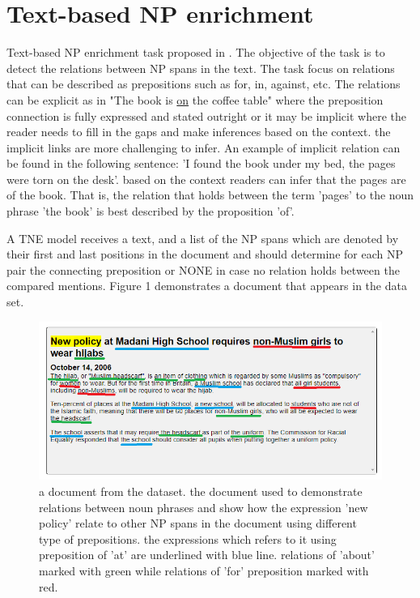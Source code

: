 \documentclass[11pt, a4paper, twocolumn]{article}
\begin{document}
\section{Text-based NP enrichment}
\label{task}

Text-based NP enrichment task proposed in \cite{tne}. The objective of the task is to detect the relations between NP spans in the text. The task focus on relations that can be described as prepositions such as for, in, against, etc.
The relations can be explicit as in "The book is 
\underline{on} the coffee table" where the preposition connection is fully expressed and stated outright or it may be implicit where the reader needs to fill in the gaps and make inferences based on the context. the implicit links are more challenging to infer.
An example of implicit relation can be found in the following sentence:
'I found the book under my bed, the pages were torn on the desk'.
based on the context readers can infer that the pages are of the book. That is, the relation that holds between the term 'pages' to the noun phrase 'the book' is best described by the proposition 'of'.

A TNE model receives a text, and a list of the NP spans which are denoted by their first and last positions in the document and should determine for each NP pair the connecting preposition or NONE in case no relation holds between the compared mentions.
Figure 1 demonstrates a document that appears in the data set. 

\begin{figure}
    \centering
    \includegraphics[width=\linewidth]{sample1.png}
    \caption{a document from the dataset. the document used to demonstrate relations between noun phrases and show how the expression 'new policy' relate to other NP spans in the document using different type of prepositions.
    the expressions which refers to it using preposition of 'at' are underlined with blue line. relations of 'about' marked with green while relations of 'for' preposition marked with red.  }
    \label{fig:my_label}
\end{figure}
\end{document}
